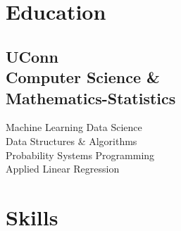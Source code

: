 \documentclass[]{resume-template}
\begin{document}
%
%
\lastupdated{}

%
%

%
%

\begin{minipage}[t]{0.33\textwidth}


    \section{Education}\label{sec:education}

    \subsection{UConn\\ Computer Science \&\\
        Mathematics-Statistics}\label{subsec:uconn}
    \vspace{\topsep}

    \label{subsec:coursework}
    Machine Learning \textbullet{} Data Science \\
    Data Structures \& Algorithms\\
    Probability \textbullet{} Systems Programming\\
    Applied Linear Regression
    \sectionsep{}



    \section{Skills}\label{sec:skills}

\end{minipage}
\end{document}
